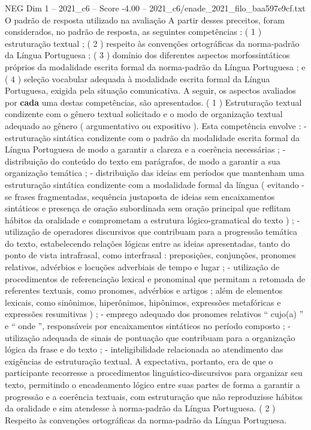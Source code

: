 \begin{textsample}{NEG Dim 1 – 2021\_c6 – Score -4.00 – 2021\_c6/enade\_2021\_filo\_baa597e9cf.txt}
O padrão de resposta utilizado na avaliação A partir desses preceitos, foram considerados, no padrão de resposta, as seguintes competências : ( 1 ) estruturação textual ; ( 2 ) respeito às convenções ortográficas da norma-padrão da Língua Portuguesa ; ( 3 ) domínio dos diferentes aspectos morfossintáticos próprios da modalidade escrita formal da norma-padrão da Língua Portuguesa ; e ( 4 ) seleção vocabular adequada à modalidade escrita formal da Língua Portuguesa, exigida pela situação comunicativa.
A seguir, os aspectos avaliados por \textbf{cada} uma destas competências, são apresentados. ( 1 ) Estruturação textual condizente com o gênero textual solicitado e o modo de organização textual adequado ao gênero ( argumentativo ou expositivo ).
Esta competência envolve : - estruturação sintática condizente com o padrão da modalidade escrita formal da Língua Portuguesa de modo a garantir a clareza e a coerência necessárias ; - distribuição do conteúdo do texto em parágrafos, de modo a garantir a sua organização temática ; - distribuição das ideias em períodos que mantenham uma estruturação sintática condizente com a modalidade formal da língua ( evitando -se frases fragmentadas, sequência justaposta de ideias sem encaixamentos sintáticos e presença de oração subordinada sem oração principal que reflitam hábitos da oralidade e comprometam a estrutura lógico-gramatical do texto ) ; - utilização de operadores discursivos que contribuam para a progressão temática do texto, estabelecendo relações lógicas entre as ideias apresentadas, tanto do ponto de vista intrafrasal, como interfrasal : preposições, conjunções, pronomes relativos, advérbios e locuções adverbiais de tempo e lugar ; - utilização de procedimentos de referenciação lexical e pronominal que permitam a retomada de referentes textuais, como pronomes, advérbios e artigos ; além de elementos lexicais, como sinônimos, hiperônimos, hipônimos, expressões metafóricas e expressões resumitivas ) ; - emprego adequado dos pronomes relativos “ cujo(a) ” e “ onde ”, responsáveis por encaixamentos sintáticos no período composto ; - utilização adequada de sinais de pontuação que contribuam para a organização lógica da frase e do texto ; - inteligibilidade relacionada ao atendimento das exigências de estruturação textual.
A expectativa, portanto, era de que o participante recorresse a procedimentos linguístico-discursivos para organizar seu texto, permitindo o encadeamento lógico entre suas partes de forma a garantir a progressão e a coerência textuais, com estruturação que não reproduzisse hábitos da oralidade e sim atendesse à norma-padrão da Língua Portuguesa. ( 2 ) Respeito às convenções ortográficas da norma-padrão da Língua Portuguesa.

\end{textsample}

